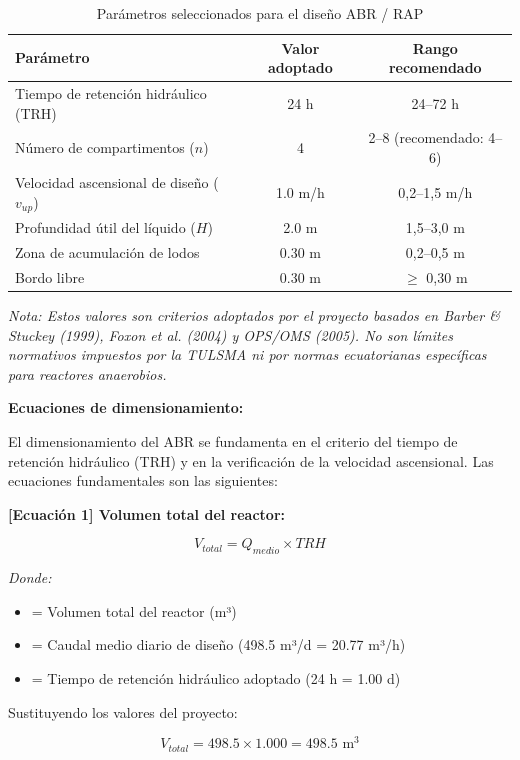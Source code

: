\documentclass[12pt,a4paper]{article}
\begin{document}
\begin{table}[H]
\centering
\caption{Parámetros seleccionados para el diseño ABR / RAP}
\begin{tabular}{p{6cm}cc}
\toprule
\textbf{Parámetro} & \textbf{Valor adoptado} & \textbf{Rango recomendado} \\
\midrule
Tiempo de retención hidráulico (TRH) & 24 h & 24--72 h \\
Número de compartimentos ($n$) & 4 & 2--8 (recomendado: 4--6) \\
Velocidad ascensional de diseño ($v_{up}$) & 1.0 m/h & 0,2--1,5 m/h \\
Profundidad útil del líquido ($H$) & 2.0 m & 1,5--3,0 m \\
Zona de acumulación de lodos & 0.30 m & 0,2--0,5 m \\
Bordo libre & 0.30 m & $\geq$ 0,30 m \\
\bottomrule
\end{tabular}
\end{table}

\textit{Nota: Estos valores son criterios adoptados por el proyecto basados en Barber \& Stuckey (1999), Foxon et al. (2004) y OPS/OMS (2005). No son límites normativos impuestos por la TULSMA ni por normas ecuatorianas específicas para reactores anaerobios.}

\textbf{Ecuaciones de dimensionamiento:}

El dimensionamiento del ABR se fundamenta en el criterio del tiempo de retención hidráulico (TRH) y en la verificación de la velocidad ascensional. Las ecuaciones fundamentales son las siguientes:

\textbf{[Ecuación 1] Volumen total del reactor:}

\begin{equation}
V_{total} = Q_{medio} \times TRH
\end{equation}

\textit{Donde:}
\begin{itemize}[noitemsep,leftmargin=2em]
    \item[$V_{total}$] = Volumen total del reactor (m³)
    \item[$Q_{medio}$] = Caudal medio diario de diseño (498.5 m³/d = 20.77 m³/h)
    \item[$TRH$] = Tiempo de retención hidráulico adoptado (24 h = 1.00 d)
\end{itemize}

Sustituyendo los valores del proyecto:

\begin{equation}
V_{total} = 498.5 \times 1.000 = 498.5 \text{ m}^3
\end{equation}
\end{document}
